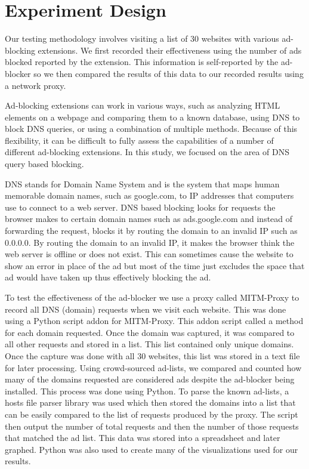 \documentclass[sigsmall]{acmart}
\begin{document}
\section*{Experiment Design}
Our testing methodology involves visiting a list of 30 websites with various ad-blocking extensions. We first recorded their effectiveness using the number of ads blocked reported by the extension. This information is self-reported by the ad-blocker so we then compared the results of this data to our recorded results using a network proxy.

Ad-blocking extensions can work in various ways, such as analyzing HTML elements on a webpage and comparing them to a known database, using DNS to block DNS queries, or using a combination of multiple methods. Because of this flexibility, it can be difficult to fully assess the capabilities of a number of different ad-blocking extensions. In this study, we focused on the area of DNS query based blocking.

DNS stands for Domain Name System and is the system that maps human memorable domain names, such as google.com, to IP addresses that computers use to connect to a web server. DNS based blocking looks for requests the browser makes to certain domain names such as ads.google.com and instead of forwarding the request, blocks it by routing the domain to an invalid IP such as 0.0.0.0. By routing the domain to an invalid IP, it makes the browser think the web server is offline or does not exist. This can sometimes cause the website to show an error in place of the ad but most of the time just excludes the space that ad would have taken up thus effectively blocking the ad.

To test the effectiveness of the ad-blocker we use a proxy called MITM-Proxy to record all DNS (domain) requests when we visit each website. This was done using a Python script addon for MITM-Proxy. This addon script called a method for each domain requested. Once the domain was captured, it was compared to all other requests and stored in a list. This list contained only unique domains. Once the capture was done with all 30 websites, this list was stored in a text file for later processing. Using crowd-sourced ad-lists, we compared and counted how many of the domains requested are considered ads despite the ad-blocker being installed. This process was done using Python. To parse the known ad-lists, a hosts file parser library was used which then stored the domains into a list that can be easily compared to the list of requests produced by the proxy. The script then output the number of total requests and then the number of those requests that matched the ad list. This data was stored into a spreadsheet and later graphed. Python was also used to create many of the visualizations used for our results.
\end{document}
